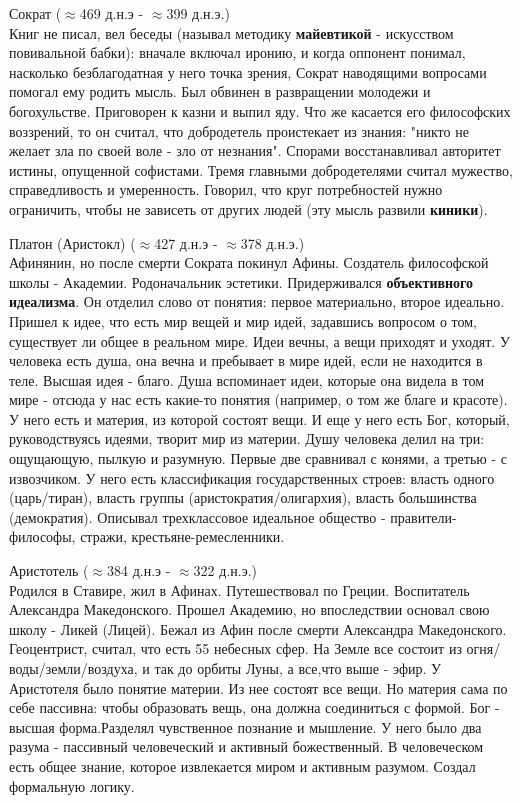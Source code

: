 \documentclass[12pt,a4paper]{article}
\begin{document}
Сократ ($\approx$469 д.н.э - $\approx$399 д.н.э.)\\
Книг не писал, вел беседы (называл методику \textbf{майевтикой} - искусством повивальной бабки): вначале включал иронию, и когда оппонент понимал, насколько безблагодатная у него точка зрения, Сократ наводящими вопросами помогал ему родить мысль. Был обвинен в развращении молодежи и богохульстве. Приговорен к казни и выпил яду. Что же касается его философских воззрений, то он считал, что добродетель проистекает из знания: "никто не желает зла по своей воле - зло от незнания". Спорами восстанавливал авторитет истины, опущенной софистами. Тремя главными добродетелями считал мужество, справедливость и умеренность. Говорил, что круг потребностей нужно ограничить, чтобы не зависеть от других людей (эту мысль развили \textbf{киники}).

Платон (Аристокл) ($\approx$427 д.н.э - $\approx$378 д.н.э.)\\
Афинянин, но после смерти Сократа покинул Афины. Создатель философской школы - Академии. Родоначальник эстетики. Придерживался \textbf{объективного идеализма}. Он отделил слово от понятия: первое материально, второе идеально. Пришел к идее, что есть мир вещей и мир идей, задавшись вопросом о том, существует ли общее в реальном мире. Идеи вечны, а вещи приходят и уходят. У человека есть душа, она вечна и пребывает в мире идей, если не находится в теле. Высшая идея - благо. Душа вспоминает идеи, которые она видела в том мире - отсюда у нас есть какие-то понятия (например, о том же благе и красоте). У него есть и материя, из которой состоят вещи. И еще у него есть Бог, который, руководствуясь идеями, творит мир из материи. Душу человека делил на три: ощущающую, пылкую и разумную. Первые две сравнивал с конями, а третью - с извозчиком. У него есть классификация государственных строев: власть одного (царь/тиран), власть группы (аристократия/олигархия), власть большинства (демократия). Описывал трехклассовое идеальное общество - правители-философы, стражи, крестьяне-ремесленники.

Аристотель ($\approx$384 д.н.э - $\approx$322 д.н.э.)\\
Родился в Ставире, жил в Афинах. Путешествовал по Греции. Воспитатель Александра Македонского. Прошел Академию, но впоследствии основал свою школу - Ликей (Лицей). Бежал из Афин после смерти Александра Македонского. Геоцентрист, считал, что есть 55 небесных сфер. На Земле все состоит из огня/воды/земли/воздуха, и так до орбиты Луны, а все,что выше - эфир. У Аристотеля было понятие материи. Из нее состоят все вещи. Но материя сама по себе пассивна: чтобы образовать вещь, она должна соединиться с формой. Бог - высшая форма.Разделял чувственное познание и мышление. У него было два разума - пассивный человеческий и активный божественный. В человеческом есть общее знание, которое извлекается миром и активным разумом. Создал формальную логику.
\end{document}
